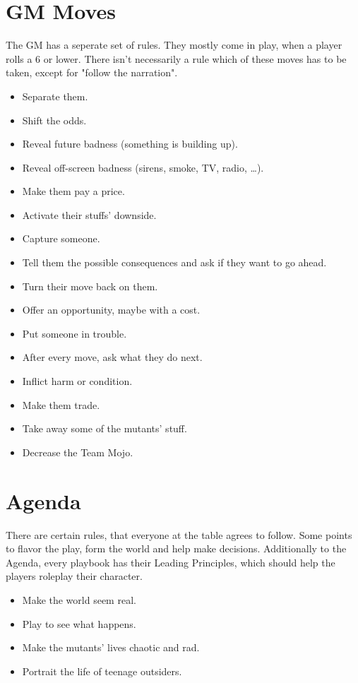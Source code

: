 \documentclass{book}
\begin{document}
\section*{GM Moves}
The GM has a seperate set of rules. They mostly come in play, when a player rolls a 6 or lower. There isn't necessarily a rule which of these moves has to be taken, except for "follow the narration".
\begin{itemize}
    \item Separate them.
    \item Shift the odds.
    \item Reveal future badness (something is building up).
    \item Reveal off-screen badness (sirens, smoke, TV, radio, …).
    \item Make them pay a price.
    \item Activate their stuffs' downside.
    \item Capture someone.
    \item Tell them the possible consequences and ask if they want to go ahead.
    \item Turn their move back on them.
    \item Offer an opportunity, maybe with a cost.
    \item Put someone in trouble.
    \item After every move, ask what they do next.
    \item Inflict harm or condition.
    \item Make them trade.
    \item Take away some of the mutants' stuff.
    \item Decrease the Team Mojo.
\end{itemize}

\section*{Agenda}
There are certain rules, that everyone at the table agrees to follow. Some points to flavor the play, form the world and help make decisions. Additionally to the Agenda, every playbook has their Leading Principles, which should help the players roleplay their character.
\begin{itemize}
    \item Make the world seem real.
    \item Play to see what happens.
    \item Make the mutants' lives chaotic and rad.
    \item Portrait the life of teenage outsiders.
\end{itemize}
\end{document}
